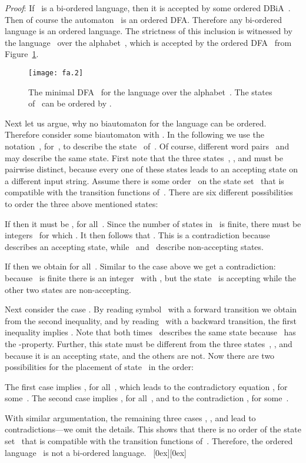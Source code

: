 \documentclass[submission]{eptcs}
\newcommand{\dfa}{\textrm{DFA}}
\newcommand{\dbia}{\textrm{DBiA}}
\newcommand*{\qed}{\raisebox{0.5ex}[0ex][0ex]{\framebox[1ex][l]{}}}
\newenvironment{proof}{\par\noindent
  {\rmfamily\itshape\mdseries Proof\/}:\hspace{\labelsep}\ignorespaces}{\mbox{}\nolinebreak\hfill~{\qed}
  \medbreak
}
\begin{document}
\begin{proof}
  If~ is a bi-ordered language, then it is accepted by some ordered
  \dbia~.  Then of course the automaton~ is an ordered
  \dfa.  Therefore any bi-ordered language is an ordered language.
  The strictness of this inclusion is witnessed by the
  language~ over the alphabet~,
  which is accepted by the ordered \dfa~ from
  Figure~\ref{fig:ordered-dfa-SigStar-ab-SigStar}.
\begin{figure}
    \centering
    \texttt{[image: fa.2]}
    \caption{The minimal \dfa~ for the language  over the alphabet~.  The states
      of~ can be ordered by .}
    \label{fig:ordered-dfa-SigStar-ab-SigStar}
  \end{figure}
  
  Next let us argue, why no biautomaton for the language  can be ordered.  Therefore consider some biautomaton
   with .
  In the following we use the notation~, for~,
  to describe the state~ of~.  Of course,
  different word pairs~ and~ may describe the same
  state.  First note that the three states~,
  , and  must be pairwise distinct, because
  every one of these states leads to an accepting state on a different
  input string.  Assume there is some order~ on the state
  set~ that is compatible with the transition functions of~.
  There are six different possibilities to order the three above
  mentioned states:
  
  If  then it
  must be , for
  all~.  Since the number of states in~ is finite, there
  must be integers~ for which .  It then follows that .  This is a contradiction because~
  describes an accepting state, while~
  and~ describe non-accepting states.

  If  then we
  obtain  for
  all~.  Similar to the case above we get a contradiction:
  because~ is finite there is an integer~ with
  , but the
  state~ is accepting while the other two states are
  non-accepting.

  Next consider the case .  By reading symbol~ with a forward transition we
  obtain  from the second inequality, and by
  reading~ with a backward transition, the first inequality implies
  .  Note that both times~ describes the
  same state because~ has the -property.  Further, this
  state must be different from the three states~,
  , and~ because it is an accepting
  state, and the others are not.  Now there are two possibilities for
  the placement of state~ in the order:

The first case implies , for all~, which leads to the contradictory
  equation , for
  some~.  The second case implies , for all~, and to the
  contradiction , for
  some~.

  With similar argumentation, the remaining three cases , , and  lead to contradictions---we omit
  the details.  This shows that there is no order of the state set~
  that is compatible with the transition functions of~.  Therefore,
  the ordered language~ is not a bi-ordered
  language.
\end{proof}
\end{document}
